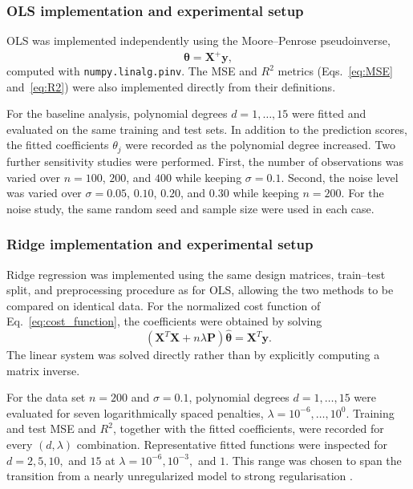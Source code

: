 \documentclass[aps,rmp,reprint,amsmath,amssymb,graphicx,longbibliography]{revtex4-1}
\begin{document}
\subsubsection*{OLS implementation and experimental setup}

OLS was implemented independently using the Moore--Penrose
pseudoinverse,
\begin{equation}
    \hat{\boldsymbol{\theta}}
    =
    \mathbf{X}^{+}\mathbf{y},
\end{equation}
computed with \texttt{numpy.linalg.pinv}. The MSE and $R^2$ metrics (Eqs.~\ref{eq:MSE} and~\ref{eq:R2}) were also
implemented directly from their definitions.

For the baseline analysis, polynomial degrees $d=1,\ldots,15$ were fitted and
evaluated on the same training and test sets. In addition to the prediction
scores, the fitted coefficients $\theta_j$ were recorded as the polynomial
degree increased. Two further sensitivity studies were performed. First, the
number of observations was varied over $n=100$, $200$, and $400$ while keeping
$\sigma=0.1$. Second, the noise level was varied over $\sigma=0.05$, $0.10$, $0.20$, and $0.30$ while keeping $n=200$. For the noise study, the same random seed and sample size were used in each case.

\subsubsection*{Ridge implementation and experimental setup}

Ridge regression was implemented using the same design matrices, train--test
split, and preprocessing procedure as for OLS, allowing the two methods to be
compared on identical data. For the normalized cost function of Eq.~\ref{eq:cost_function}, the coefficients were obtained by solving
\begin{equation}
    \left(
    \mathbf{X}^{T}\mathbf{X}
    + n\lambda\mathbf{P}
    \right)
    \hat{\boldsymbol{\theta}}
    =
    \mathbf{X}^{T}\mathbf{y}.
\end{equation}
The linear system was solved directly rather than by explicitly
computing a matrix inverse.

For the data set $n=200$ and $\sigma=0.1$, polynomial degrees
$d=1,\ldots,15$ were evaluated for seven logarithmically spaced penalties,
$\lambda=10^{-6},\ldots,10^{0}$. Training and test MSE and $R^2$, together
with the fitted coefficients, were recorded for every $(d,\lambda)$
combination. Representative fitted functions were inspected for
$d=2,5,10,$ and $15$ at $\lambda=10^{-6},10^{-3},$ and $1$.
This range was chosen to span the transition from a nearly unregularized model
to strong regularisation \cite{UiOProject1_2026}.
\end{document}
